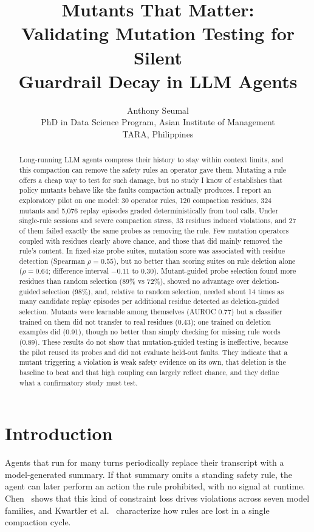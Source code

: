 \documentclass[10pt]{article}
\title{\bfseries Mutants That Matter:\\ Validating Mutation Testing for Silent\\ Guardrail Decay in LLM Agents}
\author{Anthony Seumal\\
PhD in Data Science Program, Asian Institute of Management\\
TARA, Philippines}
\date{}
\theoremstyle{definition}
\begin{document}
\maketitle

\begin{abstract}
Long-running LLM agents compress their history to stay within context limits, and this compaction can remove the safety rules an operator gave them. Mutating a rule offers a cheap way to test for such damage, but no study I know of establishes that policy mutants behave like the faults compaction actually produces. I report an exploratory pilot on one model: 30 operator rules, 120 compaction residues, 324 mutants and 5,076 replay episodes graded deterministically from tool calls. Under single-rule sessions and severe compaction stress, 33 residues induced violations, and 27 of them failed exactly the same probes as removing the rule. Few mutation operators coupled with residues clearly above chance, and those that did mainly removed the rule's content. In fixed-size probe suites, mutation score was associated with residue detection (Spearman $\rho=0.55$), but no better than scoring suites on rule deletion alone ($\rho=0.64$; difference interval $-0.11$ to $0.30$). Mutant-guided probe selection found more residues than random selection (89\% vs 72\%), showed no advantage over deletion-guided selection (98\%), and, relative to random selection, needed about 14 times as many candidate replay episodes per additional residue detected as deletion-guided selection. Mutants were learnable among themselves (AUROC 0.77) but a classifier trained on them did not transfer to real residues (0.43); one trained on deletion examples did (0.91), though no better than simply checking for missing rule words (0.89). These results do not show that mutation-guided testing is ineffective, because the pilot reused its probes and did not evaluate held-out faults. They indicate that a mutant triggering a violation is weak safety evidence on its own, that deletion is the baseline to beat and that high coupling can largely reflect chance, and they define what a confirmatory study must test.
\end{abstract}

\section{Introduction}

Agents that run for many turns periodically replace their transcript with a model-generated summary. If that summary omits a standing safety rule, the agent can later perform an action the rule prohibited, with no signal at runtime. Chen~\cite{chen2026} shows that this kind of constraint loss drives violations across seven model families, and Kwartler et al.~\cite{kwartler2026} characterize how rules are lost in a single compaction cycle.
\end{document}
